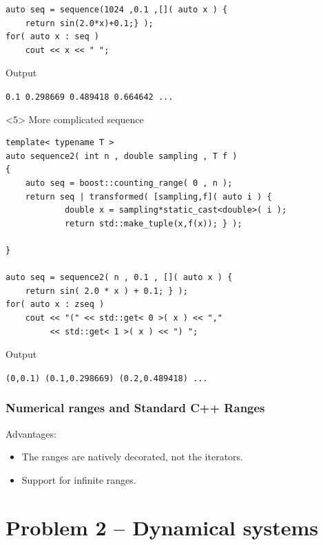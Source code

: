 \documentclass{beamer}
\newcommand{\heading}[1]{\frametitle{#1}}
\newcommand{\sectionslide}[1]{\frame{\begin{centerline}{\LARGE #1}\end{centerline}}}
\begin{document}
\begin{frame}[fragile]
\begin{onlyenv}
\begin{lstlisting}[basicstyle=\scriptsize\ttfamily]
auto seq = sequence(1024 ,0.1 ,[]( auto x ) {
    return sin(2.0*x)+0.1;} );
for( auto x : seq )
    cout << x << " ";
\end{lstlisting}
\vspace{2ex}Output

\vspace{0.5ex}\lstinline$0.1 0.298669 0.489418 0.664642 ...$
 \end{onlyenv}
 \begin{onlyenv}<5>
  More complicated sequence
\begin{lstlisting}[basicstyle=\scriptsize\ttfamily]
template< typename T >
auto sequence2( int n , double sampling , T f )
{
    auto seq = boost::counting_range( 0 , n );
    return seq | transformed( [sampling,f]( auto i ) {
            double x = sampling*static_cast<double>( i );
            return std::make_tuple(x,f(x)); } );

}

auto seq = sequence2( n , 0.1 , []( auto x ) {
    return sin( 2.0 * x ) + 0.1; } );
for( auto x : zseq )
    cout << "(" << std::get< 0 >( x ) << ","
         << std::get< 1 >( x ) << ") ";
\end{lstlisting}
\vspace{2ex}Output

\vspace{0.5ex}\lstinline$(0,0.1) (0.1,0.298669) (0.2,0.489418) ...$
 \end{onlyenv}
\end{frame}


\begin{frame}[fragile]
  \heading{Numerical ranges and Standard C++ Ranges}
  
  Advantages:
  \begin{itemize}
   \item The ranges are natively decorated, not the iterators.
   \item Support for infinite ranges.
  \end{itemize}

 
\end{frame}


\section{Problem 2 -- Dynamical systems}

\sectionslide{Dynamical systems}
\end{document}
